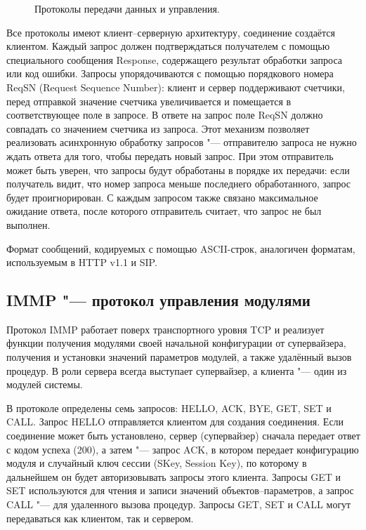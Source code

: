 \begin{figure}[ht]
  \caption{Протоколы передачи данных и управления.}
  \label{fig:ch5_protocols}
\end{figure}

Все протоколы имеют клиент--серверную архитектуру, соединение создаётся клиентом. Каждый запрос должен подтверждаться получателем с помощью специального сообщения Response, содержащего результат обработки запроса или код ошибки. Запросы упорядочиваются с помощью порядкового номера ReqSN (Request Sequence Number): клиент и сервер поддерживают счетчики, перед отправкой значение счетчика увеличивается и помещается в соответствующее поле в запросе. В ответе на запрос поле ReqSN должно совпадать со значением счетчика из запроса. Этот механизм позволяет реализовать асинхронную обработку запросов "--- отправителю запроса не нужно ждать ответа для того, чтобы передать новый запрос. При этом отправитель может быть уверен, что запросы будут обработаны в порядке их передачи: если получатель видит, что номер запроса меньше последнего обработанного, запрос будет проигнорирован. С каждым запросом также связано максимальное ожидание ответа, после которого отправитель считает, что запрос не был выполнен.

Формат сообщений, кодируемых с помощью ASCII-строк, аналогичен форматам, используемым в HTTP v1.1 и SIP.


\subsection{IMMP "--- протокол управления модулями}\label{sec:ch5_immp}

Протокол IMMP работает поверх транспортного уровня TCP и реализует функции получения модулями своей начальной конфигурации от супервайзера, получения и установки значений параметров модулей, а также удалённый вызов процедур. В роли сервера всегда выступает супервайзер, а клиента "--- один из модулей системы.

В протоколе определены семь запросов: HELLO, ACK, BYE, GET, SET и CALL. Запрос HELLO отправляется клиентом для создания соединения. Если соединение может быть установлено, сервер (супервайзер) сначала передает ответ с кодом успеха (200), а затем "--- запрос ACK, в котором передает конфигурацию модуля и случайный ключ сессии (SKey, Session Key), по которому в дальнейшем он будет авторизовывать запросы этого клиента. Запросы GET и SET используются для чтения и записи значений объектов--параметров, а запрос CALL "--- для удаленного вызова процедур. Запросы GET, SET и CALL могут передаваться как клиентом, так и сервером.

